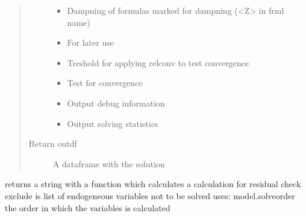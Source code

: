 \documentclass[letterpaper,10pt,english]{sphinxmanual}
\begin{document}
\begin{fulllineitems}
\begin{fulllineitems}
\begin{quote}
\begin{description}
\begin{itemize}
\item {} 
\sphinxAtStartPar
{} \textendash{} Dampning of formulas marked for dampning (\textless{}Z\textgreater{} in frml name)

\item {} 
\sphinxAtStartPar
{} \textendash{} For later use

\item {} 
\sphinxAtStartPar
{} \textendash{} Treshold for applying relconv to test convergence

\item {} 
\sphinxAtStartPar
{} \textendash{} Test for convergence

\item {} 
\sphinxAtStartPar
{} \textendash{} Output debug information

\item {} 
\sphinxAtStartPar
{} \textendash{} Output solving statistics

\end{itemize}

\item[{Return outdf}] \leavevmode
\sphinxAtStartPar
A dataframe with the solution

\end{description}\end{quote}

\end{fulllineitems}


\begin{fulllineitems}
\label{\detokenize{core/modelclass:modelclass.BaseModel.outres}}
\pysigstartsignatures
{}
\pysigstopsignatures
\sphinxAtStartPar
returns a string with a function which calculates a
calculation for residual check
exclude is list of endogeneous variables not to be solved
uses:
model.solveorder the order in which the variables is calculated

\end{fulllineitems}


\end{fulllineitems}
\end{document}

